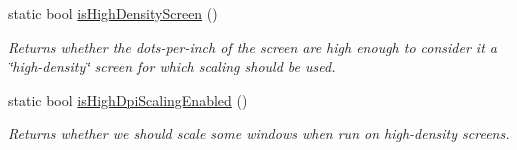 \begin{DoxyCompactItemize}
static bool \mbox{\hyperlink{classGWindow_a674ef3ad6e66d778e410e130cad47274}{is\+High\+Density\+Screen}} ()
\begin{DoxyCompactList}\small\item\em Returns whether the dots-\/per-\/inch of the screen are high enough to consider it a \char`\"{}high-\/density\char`\"{} screen for which scaling should be used. \end{DoxyCompactList}\item 
static bool \mbox{\hyperlink{classGWindow_a040690336154a3f414001a16ffdb947e}{is\+High\+Dpi\+Scaling\+Enabled}} ()
\begin{DoxyCompactList}\small\item\em Returns whether we should scale some windows when run on high-\/density screens. \end{DoxyCompactList}\end{DoxyCompactItemize}

